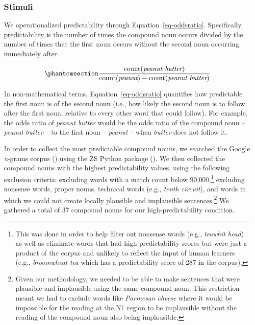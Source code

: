 \documentclass[
  12pt,
  letterpaper,
]{scrreport}
\begin{document}
\subsubsection{Stimuli}\label{stimuli-1}

We operationalized predictability through Equation~\ref{eq-oddsratio}.
Specifically, predictability is the number of times the compound noun
occurs divided by the number of times that the first noun occurs without
the second noun occurring immediately after.

\begin{equation}\phantomsection\label{eq-oddsratio}{
\frac{\mathrm{count(\textit{peanut butter})}}{\mathrm{count(\textit{peanut})} - \mathrm{count(\textit{peanut butter})}} 
}\end{equation}

In non-mathematical terms, Equation~\ref{eq-oddsratio} quantifies how
predictable the first noun is of the second noun (i.e., how likely the
second noun is to follow after the first noun, relative to every other
word that could follow). For example, the odds ratio of \emph{peanut
butter} would be the odds ratio of the compound noun -- \emph{peanut
butter} -- to the first noun -- \emph{peanut} -- when \emph{butter} does
not follow it.

In order to collect the most predictable compound nouns, we searched the
Google \emph{n}-grams corpus
() using the ZS Python package
(). We then collected
the compound nouns with the highest predictability values, using the
following exclusion criteria: excluding words with a match count below
90,000,\footnote{This was done in order to help filter out nonsense
  words (e.g., \emph{teawhit head}) as well as eliminate words that had
  high predictability scores but were just a product of the corpus and
  unlikely to reflect the input of human learners (e.g.,
  \emph{broomwheat tea} which has a predictability score of 287 in the
  corpus).} excluding nonsense words, proper nouns, technical words
(e.g., \emph{tenth circuit}), and words in which we could not create
locally plausible and implausible sentences.\footnote{Given our
  methodology, we needed to be able to make sentences that were
  plausible and implausible using the same compound noun. This
  restriction meant we had to exclude words like \emph{Parmesan cheese}
  where it would be impossible for the reading at the N1 region to be
  implausible without the reading of the compound noun also being
  implausible.} We gathered a total of 37 compound nouns for our
high-predictability condition.
\end{document}
